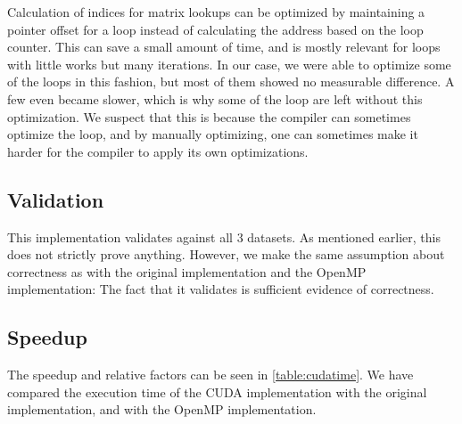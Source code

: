 \documentclass[11pt]{article}
\begin{document}
Calculation of indices for matrix lookups can be optimized by maintaining a pointer offset for a loop instead of calculating the address based on the loop counter.
This can save a small amount of time, and is mostly relevant for loops with little works but many iterations.
In our case, we were able to optimize some of the loops in this fashion, but most of them showed no measurable difference.
A few even became slower, which is why some of the loop are left without this optimization.
We suspect that this is because the compiler can sometimes optimize the loop, and by manually optimizing, one can sometimes make it harder for the compiler to apply its own optimizations.

\subsection{Validation}
This implementation validates against all 3 datasets. As mentioned earlier, this does not strictly prove anything. However, we make the same assumption about correctness as with the 
original implementation and the OpenMP implementation: The fact that it 
validates is sufficient evidence of correctness.

\subsection{Speedup}
The speedup and relative factors can be seen in \autoref{table:cudatime}. 
We have compared the execution time of the CUDA implementation with the 
original implementation, and with the OpenMP implementation. 

\begin{table}[h]
\centering
{}
\caption{Speedup comparison of the original implementation, the OpenMP implementation and the CUDA implementation}
\label{table:cudatime}
\end{table}
\end{document}
